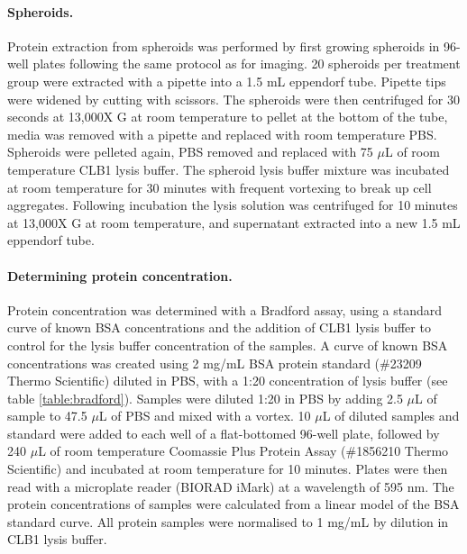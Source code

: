 \documentclass[a4paper,11pt,twoside,openright]{scrbook}
\begin{document}
\paragraph{Spheroids.}
Protein extraction from spheroids was performed by first growing spheroids in 96-well plates following the same 
protocol as for imaging.
20 spheroids per treatment group were extracted with a pipette into a 1.5 mL eppendorf tube.
Pipette tips were widened by cutting with scissors.
The spheroids were then centrifuged for 30 seconds at 13,000X G at room temperature to pellet at the bottom of the 
tube, media was removed with a pipette and replaced with room temperature PBS.
Spheroids were pelleted again, PBS removed and replaced with 75 $\mu$L of room temperature CLB1 lysis buffer.
The spheroid lysis buffer mixture was incubated at room temperature for 30 minutes with frequent vortexing to break up 
cell aggregates.
Following incubation the lysis solution was centrifuged for 10 minutes at 13,000X G at room temperature, and 
supernatant extracted into a new 1.5 mL eppendorf tube.

\paragraph{Determining protein concentration.}
Protein concentration was determined with a Bradford assay, using a standard curve of known BSA concentrations and the 
addition of CLB1 lysis buffer to control for the lysis buffer concentration of the samples.
A curve of known BSA concentrations was created using 2 mg/mL BSA protein standard (\#23209 Thermo Scientific) diluted 
in PBS, with a 1:20 concentration of lysis buffer (see table \ref{table:bradford}).
Samples were diluted 1:20 in PBS by adding 2.5 $\mu$L of sample to 47.5 $\mu$L of PBS and mixed with a vortex.
10 $\mu$L of diluted samples and standard were added to each well of a flat-bottomed 96-well plate, followed by 240 
$\mu$L of room temperature Coomassie Plus Protein Assay (\#1856210 Thermo Scientific) and incubated at room temperature 
for 10 minutes.
Plates were then read with a microplate reader (BIORAD iMark) at a wavelength of 595 nm.
The protein concentrations of samples were calculated from a linear model of the BSA standard curve.
All protein samples were normalised to 1 mg/mL by dilution in CLB1 lysis buffer.
\end{document}
